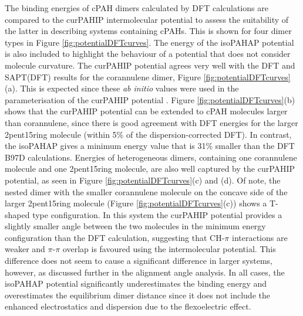 The binding energies of cPAH dimers calculated by DFT calculations are compared to the curPAHIP intermolecular potential to assess the suitability of the latter in describing systems containing cPAHs.  This is shown for four dimer types in Figure \ref{fig:potentialDFTcurves}.  The energy of the isoPAHAP potential is also included to highlight the behaviour of a potential that does not consider molecule curvature.
The curPAHIP potential agrees very well with the DFT and SAPT(DFT) results for the corannulene dimer, Figure \ref{fig:potentialDFTcurves}(a). This is expected since these \textit{ab initio} values were used in the parameterisation of the curPAHIP potential \cite{bowal2019ion}. 
Figure \ref{fig:potentialDFTcurves}(b) shows that the curPAHIP potential can be extended to cPAH molecules larger than corannulene, since there is good agreement with DFT energies for the larger 2pent15ring molecule (within 5\% of the dispersion-corrected DFT). In contrast, the isoPAHAP gives a minimum energy value that is 31\% smaller than the DFT B97D calculations.
Energies of heterogeneous dimers, containing one corannulene molecule and one 2pent15ring molecule, are also well captured by the curPAHIP potential, as seen in Figure \ref{fig:potentialDFTcurves}(c) and (d).  Of note, the nested dimer with the smaller corannulene molecule on the concave side of the larger 2pent15ring molecule (Figure \ref{fig:potentialDFTcurves}(c)) shows a T-shaped type configuration. In this system the curPAHIP potential provides a slightly smaller %
angle between the two molecules in the minimum energy configuration than the DFT calculation, suggesting that CH-$\pi$ interactions are weaker and $\pi$-$\pi$ overlap is favoured using the intermolecular potential.  This difference does not seem to cause a significant difference in larger systems, however, as discussed further in the alignment angle analysis. %
In all cases, the isoPAHAP potential significantly underestimates the binding energy and overestimates the equilibrium dimer distance since it does not include the enhanced electrostatics and dispersion due to the flexoelectric effect.

